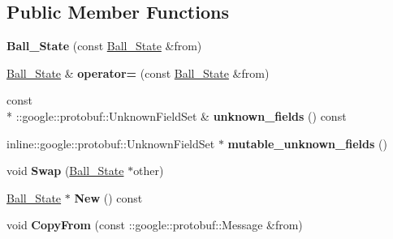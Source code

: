\subsection*{Public Member Functions}
\begin{DoxyCompactItemize}
\item 
\hypertarget{classvss__state_1_1Ball__State_ac098b9cd5c2c3ddf8e51f0d2dbbf61fa}{{\bfseries Ball\-\_\-\-State} (const \hyperlink{classvss__state_1_1Ball__State}{Ball\-\_\-\-State} \&from)}\label{classvss__state_1_1Ball__State_ac098b9cd5c2c3ddf8e51f0d2dbbf61fa}

\item 
\hypertarget{classvss__state_1_1Ball__State_aa6cd23990f9da364b87df28c633d5935}{\hyperlink{classvss__state_1_1Ball__State}{Ball\-\_\-\-State} \& {\bfseries operator=} (const \hyperlink{classvss__state_1_1Ball__State}{Ball\-\_\-\-State} \&from)}\label{classvss__state_1_1Ball__State_aa6cd23990f9da364b87df28c633d5935}

\item 
\hypertarget{classvss__state_1_1Ball__State_a794e00572c1dadaee441bf94c11d7358}{const \\*
\-::google\-::protobuf\-::\-Unknown\-Field\-Set \& {\bfseries unknown\-\_\-fields} () const }\label{classvss__state_1_1Ball__State_a794e00572c1dadaee441bf94c11d7358}

\item 
\hypertarget{classvss__state_1_1Ball__State_a5d736fb563b0a4291d927a03394309b5}{inline\-::google\-::protobuf\-::\-Unknown\-Field\-Set $\ast$ {\bfseries mutable\-\_\-unknown\-\_\-fields} ()}\label{classvss__state_1_1Ball__State_a5d736fb563b0a4291d927a03394309b5}

\item 
\hypertarget{classvss__state_1_1Ball__State_a0e0face2c7b5e5b53793aa5e218a1623}{void {\bfseries Swap} (\hyperlink{classvss__state_1_1Ball__State}{Ball\-\_\-\-State} $\ast$other)}\label{classvss__state_1_1Ball__State_a0e0face2c7b5e5b53793aa5e218a1623}

\item 
\hypertarget{classvss__state_1_1Ball__State_a8788d4ca0089f7f0c043f5c763fee116}{\hyperlink{classvss__state_1_1Ball__State}{Ball\-\_\-\-State} $\ast$ {\bfseries New} () const }\label{classvss__state_1_1Ball__State_a8788d4ca0089f7f0c043f5c763fee116}

\item 
\hypertarget{classvss__state_1_1Ball__State_a1b6e1fc62b0ed7f4a56f51107c2dea0c}{void {\bfseries Copy\-From} (const \-::google\-::protobuf\-::\-Message \&from)}\label{classvss__state_1_1Ball__State_a1b6e1fc62b0ed7f4a56f51107c2dea0c}


\end{DoxyCompactItemize}
